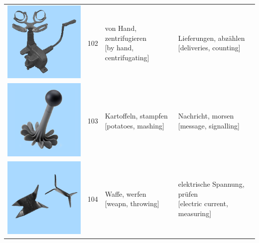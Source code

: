 \documentclass[
  english,
  man,floatsintext]{apa7}
\begin{document}
\begin{center}
\begin{ThreePartTable}
{\begin{longtable}{llll}
\includegraphics[valign=c, scale=0.23]{../materials/unfamiliar/102.png} & 102 & \makecell[l]{von Hand, zentrifugieren\\{[by hand, centrifugating]}} & \makecell[l]{Lieferungen, abzählen\\{[deliveries, counting]}}\\
\includegraphics[valign=c, scale=0.23]{../materials/unfamiliar/103.png} & 103 & \makecell[l]{Kartoffeln, stampfen\\{[potatoes, mashing]}} & \makecell[l]{Nachricht, morsen\\{[message, signalling]}}\\
\includegraphics[valign=c, scale=0.23]{../materials/unfamiliar/104.png} & 104 & \makecell[l]{Waffe, werfen\\{[weapn, throwing]}} & \makecell[l]{elektrische Spannung, prüfen\\{[electric current, measuring]}}\\

\end{longtable}}
\end{ThreePartTable}
\end{center}
\end{document}
